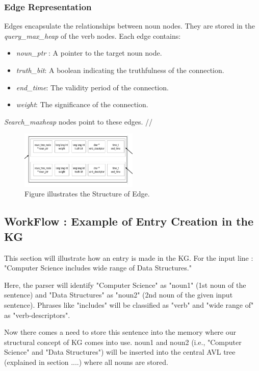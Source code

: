 \documentclass[conference]{IEEEtran}
\begin{document}
\subsubsection{Edge Representation}
Edges encapsulate the relationships between noun nodes. They are stored in the \textit{query\_max\_heap} of the verb nodes. Each edge contains:
\begin{itemize}

    \item \textit{noun\_ptr} : A pointer to the target noun node.
    \item \textit{truth\_bit}: A boolean indicating the truthfulness of the connection.
    \item \textit{end\_time}: The validity period of the connection.
    \item \textit{weight}: The significance of the connection.
\end{itemize}

\textit{Search\_maxheap} nodes point to these edges.
//




\begin{figure}[htbp]
\centerline{\includegraphics[width=0.5\textwidth]{fig_4_2.png}}
\caption{Figure illustrates the Structure of Edge.}
\label{fig}
\end{figure}



\subsection*{WorkFlow : Example of Entry Creation in the KG}

This section will illustrate how an entry is made in the KG.
For the input line : "Computer Science includes wide range of
Data Structures."

Here, the parser will identify "Computer Science" as "noun1" (1st noun of the sentence)
and "Data Structures" as "noun2" (2nd noun of the given input sentence).
Phrases like "includes" will be classified as "verb" and "wide range of" as "verb-descriptors".

Now there comes a need to store this sentence into the memory where our structural concept
of KG comes into use.
noun1 and noun2 (i.e., "Computer Science" and "Data Structures") will be inserted into the central AVL 
tree (explained in section ....) where all nouns are stored.
\end{document}
